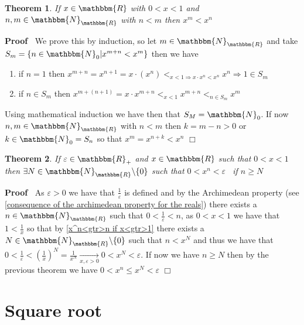 \documentclass{book}
\newcommand{\Rightarrowlim}{\mathop{\rightarrow}\limits}
\newenvironment{proof}{\noindent\textbf{Proof\ }}{\hspace*{\fill}$\Box$\medskip}
\newtheorem{theorem}{Theorem}
\begin{document}
{{\begin{theorem}
  \label{n<less>m=<gtr>x^n<less>x^m<less>x^n}If $x \in \mathbbm{R}$ with $0 <
  x < 1$ and $n, m \in \mathbbm{N}_{\mathbbm{R}}$ with $n < m$ then $x^m <
  x^n$
\end{theorem}

\begin{proof}
  We prove this by induction, so let $m \in \mathbbm{N}_{\mathbbm{R}}$ and
  take $S_m = \{ n \in \mathbbm{N}_0 |x^{m + n} < x^m \}$ then we have
  \begin{enumerate}
    \item if $n = 1$ then $x^{m + n} = x^{n + 1} = x \cdot (x^n) <_{x < 1
    \Rightarrow x \cdot x^n < x^n} x^n \Rightarrow 1 \in S_m$
    
    \item if $n \in S_m$ then $x^{m + (n + 1)} = x \cdot x^{m + n} <_{x < 1}
    x^{m + n} <_{n \in S_m} x^m$
  \end{enumerate}
  Using mathematical induction we have then that $S_M =\mathbbm{N}_0$. If now
  $n, m \in \mathbbm{N}_{\mathbbm{R}}$ with $n < m$ then $k = m - n > 0$ or $k
  \in \mathbbm{N}_0 = S_n$ so that $x^m = x^{n + k} < x^n$
\end{proof}

\begin{theorem}
  \label{0<less>x^n<less>e}If $\varepsilon \in \mathbbm{R}_+$ and $x \in
  \mathbbm{R}$ such that $0 < x < 1$ then $\exists N \in
  \mathbbm{N}_{\mathbbm{R}} \backslash \{ 0 \}$ such that $0 < x^n <
  \varepsilon$ \ if $n \geqslant N$
\end{theorem}

\begin{proof}
  As $\varepsilon > 0$ we have that $\frac{1}{\varepsilon}$ is defined and by
  the Archimedean property (see \ref{consequence of the archimedean property
  for the reals}) there exists a $n \in \mathbbm{N}_{\mathbbm{R}}$ such that
  $0 < \frac{1}{\varepsilon} < n$, as $0 < x < 1$ we have that $1 <
  \frac{1}{x}$ so that by \ref{x^n<gtr>n if x<gtr>1} there exists a $N \in
  \mathbbm{N}_{\mathbbm{R}} \backslash \{ 0 \}$ such that $n < x^N$ and thus
  we have that $0 < \frac{1}{\varepsilon} < \left( \frac{1}{x} \right)^N =
  \frac{1}{x^N} \Rightarrowlim_{x, \varepsilon > 0} 0 < x^N < \varepsilon$. If
  now we have $n \geqslant N$ then by the previous theorem we have $0 < x^n
  \leqslant x^N < \varepsilon$
\end{proof}

\section{Square root}

}}
\end{document}

